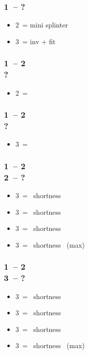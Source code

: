 \subsubsection*{1\spades\ -- ?}
\begin{itemize}
    \item 2\nt\ = mini splinter
    \item 3\hearts\ = inv + fit
\end{itemize}

\subsubsection*{1\hearts\ -- 2\spades \\ ?}
\begin{itemize}
    \item 2\nt\ = \lsf
\end{itemize}

\subsubsection*{1\spades\ -- 2\nt \\ ?}
\begin{itemize}
    \item 3\clubs\ = \lsf
\end{itemize}

\subsubsection*{1\hearts\ -- 2\spades \\ 2\nt\ -- ?}
\begin{itemize}
    \item 3\clubs\ = \clubs\ shortness
    \item 3\diams\ = \diams\ shortness
    \item 3\hearts\ = \spades\ shortness
    \item 3\spades\ = \spades\ shortness \gf\ (max)
\end{itemize}

\subsubsection*{1\spades\ -- 2\nt \\ 3\clubs\ -- ?}
\begin{itemize}
    \item 3\diams\ = \clubs\ shortness
    \item 3\hearts\ = \diams\ shortness
    \item 3\spades\ = \hearts\ shortness
    \item 3\nt\ = \hearts\ shortness \gf\ (max)
\end{itemize}

